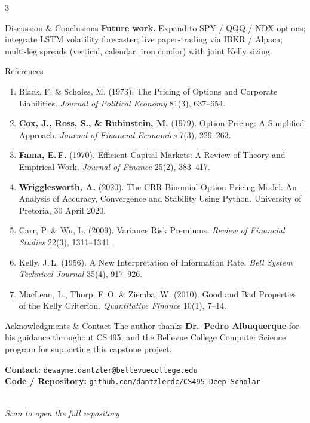 \documentclass[a0,portrait]{a0poster}
\begin{document}
\begin{multicols}{3}
\begin{posterblock}{Discussion \& Conclusions}
\vspace{0.3em}
\textbf{Future work.} Expand to SPY / QQQ / NDX options; integrate
LSTM volatility forecaster; live paper-trading via IBKR / Alpaca;
multi-leg spreads (vertical, calendar, iron condor) with joint Kelly
sizing.
\end{posterblock}

\begin{posterblock}{References}
\normalsize
\begin{enumerate}[leftmargin=1.6em,itemsep=4pt,topsep=4pt]
  \item Black, F. \& Scholes, M. (1973). The Pricing of Options and
        Corporate Liabilities. \emph{Journal of Political Economy} 81(3),
        637--654.
  \item \textbf{Cox, J., Ross, S., \& Rubinstein, M.} (1979). Option
        Pricing: A Simplified Approach. \emph{Journal of Financial
        Economics} 7(3), 229--263.
  \item \textbf{Fama, E.\,F.} (1970). Efficient Capital Markets:
        A Review of Theory and Empirical Work. \emph{Journal of
        Finance} 25(2), 383--417.
  \item \textbf{Wrigglesworth, A.} (2020). The CRR Binomial Option
        Pricing Model: An Analysis of Accuracy, Convergence and
        Stability Using Python. University of Pretoria, 30 April 2020.
  \item Carr, P. \& Wu, L. (2009). Variance Risk Premiums.
        \emph{Review of Financial Studies} 22(3), 1311--1341.
  \item Kelly, J.\,L. (1956). A New Interpretation of Information Rate.
        \emph{Bell System Technical Journal} 35(4), 917--926.
  \item MacLean, L., Thorp, E.\,O. \& Ziemba, W. (2010). Good and Bad
        Properties of the Kelly Criterion. \emph{Quantitative Finance}
        10(1), 7--14.
\end{enumerate}
\end{posterblock}

\begin{posterblock}{Acknowledgments \& Contact}
The author thanks \textbf{Dr.~Pedro Albuquerque} for his guidance
throughout CS\,495, and the Bellevue College Computer Science program
for supporting this capstone project.

\vspace{0.4em}
\textbf{Contact:} \texttt{dewayne.dantzler@bellevuecollege.edu}\\
\textbf{Code / Repository:}
\texttt{github.com/dantzlerdc/CS495-Deep-Scholar}

\vspace{0.3em}
\begin{center}
\\[0.2em]
\small\textit{Scan to open the full repository}
\end{center}
\end{posterblock}

\end{multicols}
\end{document}
